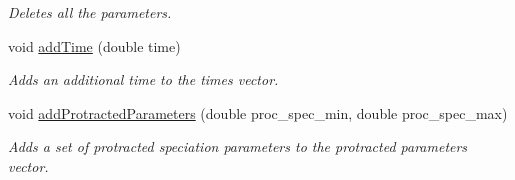 \begin{DoxyCompactItemize}
\begin{DoxyCompactList}\small\item\em Deletes all the parameters. \end{DoxyCompactList}\item 
void \hyperlink{struct_spec_sim_parameters_a78e27888e92d1b1ddfd9d9a8e129b618}{add\+Time} (double time)
\begin{DoxyCompactList}\small\item\em Adds an additional time to the times vector. \end{DoxyCompactList}\item 
void \hyperlink{struct_spec_sim_parameters_af88d55fcc175d52519a6c2a0843173eb}{add\+Protracted\+Parameters} (double proc\+\_\+spec\+\_\+min, double proc\+\_\+spec\+\_\+max)
\begin{DoxyCompactList}\small\item\em Adds a set of protracted speciation parameters to the protracted parameters vector. \end{DoxyCompactList}\end{DoxyCompactItemize}
